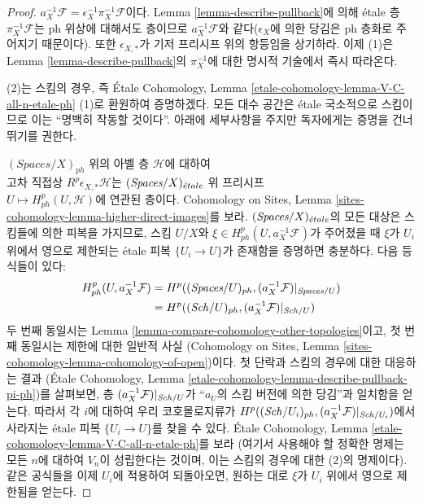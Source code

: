\begin{proof}
$a_X^{-1}\mathcal{F} = \epsilon_X^{-1} \pi_X^{-1}\mathcal{F}$이다.
Lemma \ref{lemma-describe-pullback}에 의해 \'etale 층
$\pi_X^{-1}\mathcal{F}$는 ph 위상에 대해서도 층이므로
$a_X^{-1}\mathcal{F}$와 같다($\epsilon_X$에 의한 당김은 ph 층화로
주어지기 때문이다). 또한 $\epsilon_{X, *}$가 기저 프리시프 위의
항등임을 상기하라. 이제 (1)은 Lemma
\ref{lemma-describe-pullback}의 $\pi_X^{-1}$에 대한 명시적 기술에서
즉시 따라온다.

\medskip\noindent
(2)는 스킴의 경우, 즉 \'Etale Cohomology, Lemma
\ref{etale-cohomology-lemma-V-C-all-n-etale-ph} (1)로 환원하여
증명하겠다. 모든 대수 공간은 \'etale 국소적으로 스킴이므로 이는
``명백히 작동할 것이다''. 아래에 세부사항을 주지만 독자에게는
증명을 건너뛰기를 권한다.

\medskip\noindent
$(\textit{Spaces}/X)_{ph}$ 위의 아벨 층 $\mathcal{H}$에 대하여\\
고차 직접상 $R^p\epsilon_{X, *}\mathcal{H}$는
$(\textit{Spaces}/X)_{\acute{e}tale}$ 위 프리시프\\
$U \mapsto H^p_{ph}(U, \mathcal{H})$에 연관된 층이다.
Cohomology on Sites, Lemma
\ref{sites-cohomology-lemma-higher-direct-images}를 보라.
$(\textit{Spaces}/X)_{\acute{e}tale}$의 모든 대상은 스킴들에 의한 피복을 가지므로,
스킴 $U/X$와
$\xi \in H^p_{ph}(U, a_X^{-1}\mathcal{F})$가 주어졌을 때
$\xi$가 $U_i$ 위에서 영으로 제한되는 \'etale 피복
$\{U_i \to U\}$가 존재함을 증명하면 충분하다. 다음 등식들이 있다:
\begin{align*}
H^p_{ph}(U, a_X^{-1}\mathcal{F})
& =
H^p((\textit{Spaces}/U)_{ph}, (a_X^{-1}\mathcal{F})|_{\textit{Spaces}/U}) \\
& =
H^p((\mathit{Sch}/U)_{ph}, (a_X^{-1}\mathcal{F})|_{\mathit{Sch}/U})
\end{align*}
두 번째 동일시는 Lemma
\ref{lemma-compare-cohomology-other-topologies}이고, 첫 번째 동일시는
제한에 대한 일반적 사실
(Cohomology on Sites, Lemma
\ref{sites-cohomology-lemma-cohomology-of-open})이다.
첫 단락과 스킴의 경우에 대한 대응하는 결과
(\'Etale Cohomology, Lemma
\ref{etale-cohomology-lemma-describe-pullback-pi-ph})를 살펴보면,
층 $(a_X^{-1}\mathcal{F})|_{\mathit{Sch}/U}$가 ``$a_U$의 스킴 버전에 의한
당김''과 일치함을 얻는다. 따라서 각 $i$에 대하여 우리 코호몰로지류가
$H^p((\mathit{Sch}/U_i)_{ph}, (a_X^{-1}\mathcal{F})|_{\mathit{Sch}/U_i})$에서
사라지는 \'etale 피복 $\{U_i \to U\}$를 찾을 수 있다.
\'Etale Cohomology, Lemma
\ref{etale-cohomology-lemma-V-C-all-n-etale-ph}를 보라
(여기서 사용해야 할 정확한 명제는 모든 $n$에 대하여 $V_n$이
성립한다는 것이며, 이는 스킴의 경우에 대한 (2)의 명제이다).
같은 공식들을 이제 $U_i$에 적용하여 되돌아오면, 원하는 대로
$\xi$가 $U_i$ 위에서 영으로 제한됨을 얻는다.
\end{proof}

